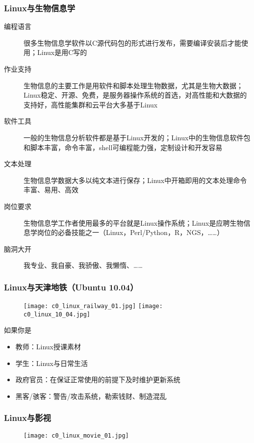 \begin{frame}
\end{frame}

\begin{frame}
  \frametitle{Linux与生物信息学}
  \begin{description}
    \item[编程语言] 很多生物信息学软件以C源代码包的形式进行发布，需要编译安装后才能使用；Linux是用C写的
    \item[作业支持] 生物信息的主要工作是用软件和脚本处理生物数据，尤其是生物大数据；Linux稳定、开源、免费，是服务器操作系统的首选，对高性能和大数据的支持好，高性能集群和云平台大多基于Linux
    \item[软件工具] 一般的生物信息分析软件都是基于Linux开发的；Linux中的生物信息软件包和脚本丰富，命令丰富，shell可编程能力强，定制设计和开发容易
    \item[文本处理] 生物信息学数据大多以纯文本进行保存；Linux中开箱即用的文本处理命令丰富、易用、高效
    \item[岗位要求] 生物信息学工作者使用最多的平台就是Linux操作系统；Linux是应聘生物信息学岗位的必备技能之一（Linux，Perl/Python，R，NGS，……）
    \item[脑洞大开] 我专业、我自豪、我骄傲、我懒惰、……
  \end{description}
\end{frame}

\begin{frame}
  \frametitle{Linux与天津地铁（Ubuntu 10.04）}
  \begin{figure}
    \centering
    \texttt{[image: c0\_linux\_railway\_01.jpg]}\quad
    \texttt{[image: c0\_linux\_10\_04.jpg]}
  \end{figure}
  \pause
  \begin{block}{如果你是}
    \begin{itemize}
      \item 教师：Linux授课素材
      \item 学生：Linux与日常生活
      \item 政府官员：在保证正常使用的前提下及时维护更新系统
      \item 黑客/骇客：警告/攻击系统，勒索钱财、制造混乱
    \end{itemize}
  \end{block}
\end{frame}

\begin{frame}
  \frametitle{Linux与影视}
  \begin{figure}
    \centering
    \texttt{[image: c0\_linux\_movie\_01.jpg]}
  \end{figure}
\end{frame}

